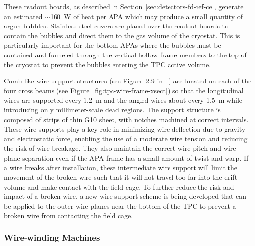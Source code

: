 These readout boards, as described in
Section~\ref{sec:detectors-fd-ref-ce}, generate an estimated
$\sim$160~W of heat per APA which may produce a small quantity of
argon bubbles.  Stainless steel covers are placed over the readout
boards to contain the bubbles and direct them to the gas volume of the
cryostat. This is particularly important for the bottom APAs where the
bubbles must be contained and funneled through the vertical hollow
frame members to the top of the cryostat to prevent the bubbles
entering the TPC active volume.

Comb-like wire support structures (see Figure~2.9 in \anxlbnefd~\cite{cdr-annex-lbne-design}) are
located on each of the four cross beams (see Figure~\ref{fig:tpc-wire-frame-xsect})
 so that the longitudinal wires
are supported every 1.2~m and the angled wires about every 1.5~m while
introducing only millimeter-scale dead regions. The support structure
is composed of strips of thin G10 sheet, with notches machined at
correct intervals.  These wire supports play a key role in minimizing
wire deflection due to gravity and electrostatic force, enabling the
use of a moderate wire tension and reducing the risk of wire breakage.
They also maintain the correct wire pitch and wire plane separation
even if the APA frame has a small amount of twist and warp.  If a wire
breaks after installation, these intermediate wire support will limit
the movement of the broken wire such that it will not travel too far
into the drift volume and make contact with the field cage.  To
further reduce the risk and impact of a broken wire, a new wire
support scheme is being developed that can be applied to the outer
wire planes near the bottom of the TPC to prevent a broken wire from
contacting the field cage.


\subsubsection{Wire-winding Machines}
\label{subsec:fd-ref-wirewinding}

